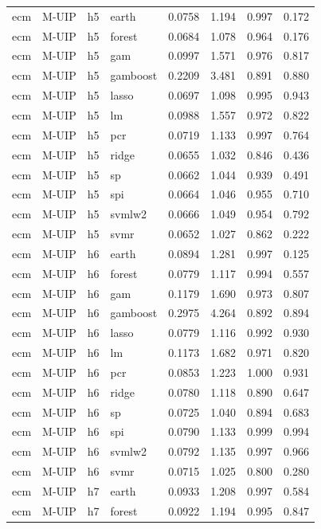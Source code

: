 \begin{ThreePartTable}
\begin{longtable}[t]{llclcccc}
\addlinespace
ecm & M-UIP & h5 & earth & 0.0758 & 1.194 & 0.997 & 0.172\\
ecm & M-UIP & h5 & forest & 0.0684 & 1.078 & 0.964 & 0.176\\
ecm & M-UIP & h5 & gam & 0.0997 & 1.571 & 0.976 & 0.817\\
ecm & M-UIP & h5 & gamboost & 0.2209 & 3.481 & 0.891 & 0.880\\
ecm & M-UIP & h5 & lasso & 0.0697 & 1.098 & 0.995 & 0.943\\
ecm & M-UIP & h5 & lm & 0.0988 & 1.557 & 0.972 & 0.822\\
ecm & M-UIP & h5 & pcr & 0.0719 & 1.133 & 0.997 & 0.764\\
ecm & M-UIP & h5 & ridge & 0.0655 & 1.032 & 0.846 & 0.436\\
ecm & M-UIP & h5 & sp & 0.0662 & 1.044 & 0.939 & 0.491\\
ecm & M-UIP & h5 & spi & 0.0664 & 1.046 & 0.955 & 0.710\\
ecm & M-UIP & h5 & svmlw2 & 0.0666 & 1.049 & 0.954 & 0.792\\
ecm & M-UIP & h5 & svmr & 0.0652 & 1.027 & 0.862 & 0.222\\
\addlinespace
ecm & M-UIP & h6 & earth & 0.0894 & 1.281 & 0.997 & 0.125\\
ecm & M-UIP & h6 & forest & 0.0779 & 1.117 & 0.994 & 0.557\\
ecm & M-UIP & h6 & gam & 0.1179 & 1.690 & 0.973 & 0.807\\
ecm & M-UIP & h6 & gamboost & 0.2975 & 4.264 & 0.892 & 0.894\\
ecm & M-UIP & h6 & lasso & 0.0779 & 1.116 & 0.992 & 0.930\\
ecm & M-UIP & h6 & lm & 0.1173 & 1.682 & 0.971 & 0.820\\
ecm & M-UIP & h6 & pcr & 0.0853 & 1.223 & 1.000 & 0.931\\
ecm & M-UIP & h6 & ridge & 0.0780 & 1.118 & 0.890 & 0.647\\
ecm & M-UIP & h6 & sp & 0.0725 & 1.040 & 0.894 & 0.683\\
ecm & M-UIP & h6 & spi & 0.0790 & 1.133 & 0.999 & 0.994\\
ecm & M-UIP & h6 & svmlw2 & 0.0792 & 1.135 & 0.997 & 0.966\\
ecm & M-UIP & h6 & svmr & 0.0715 & 1.025 & 0.800 & 0.280\\
\addlinespace
ecm & M-UIP & h7 & earth & 0.0933 & 1.208 & 0.997 & 0.584\\
ecm & M-UIP & h7 & forest & 0.0922 & 1.194 & 0.995 & 0.847\\

\end{longtable}
\end{ThreePartTable}
